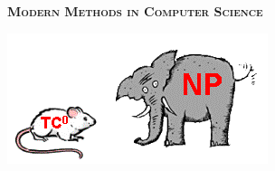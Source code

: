 


\thispagestyle{empty}

\centerline{\large \textsc{\textbf{Modern Methods in Computer Science}}}

\bigskip



\vspace{1cm}

\begin{center}
    \includegraphics[scale = 0.5]{pics/zoo.png}
\end{center}

\vspace{1cm}


\nocite{*}



